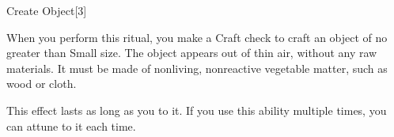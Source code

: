 \begin{spellsection}{Create Object}[3]

\begin{spellcontent}

\begin{spelltargetinginfo}



\end{spelltargetinginfo}


\begin{spelleffects}



\spelleffect
When you perform this ritual, you make a Craft check to craft an object of no greater than Small size.
The object appears out of thin air, without any raw materials.
It must be made of nonliving, nonreactive vegetable matter, such as wood or cloth.

This effect lasts as long as you  to it.
If you use this ability multiple times, you can attune to it each time.








\end{spelleffects}

\end{spellcontent}
\begin{spellfooter}


\end{spellfooter}
\begin{spellsubcontent}


\end{spellsubcontent}
\end{spellsection}


